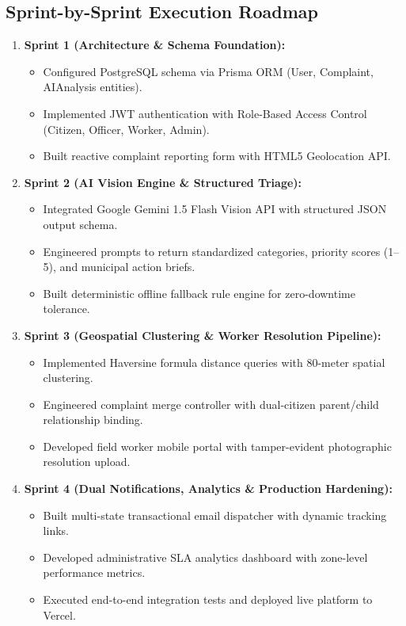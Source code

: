 \documentclass[11pt,a4paper]{article}
\begin{document}
\subsection{Sprint-by-Sprint Execution Roadmap}
\begin{enumerate}[leftmargin=1.5em]
    \item \textbf{Sprint 1 (Architecture \& Schema Foundation):}
    \begin{itemize}
        \item Configured PostgreSQL schema via Prisma ORM (User, Complaint, AIAnalysis entities).
        \item Implemented JWT authentication with Role-Based Access Control (Citizen, Officer, Worker, Admin).
        \item Built reactive complaint reporting form with HTML5 Geolocation API.
    \end{itemize}
    \item \textbf{Sprint 2 (AI Vision Engine \& Structured Triage):}
    \begin{itemize}
        \item Integrated Google Gemini 1.5 Flash Vision API with structured JSON output schema.
        \item Engineered prompts to return standardized categories, priority scores (1--5), and municipal action briefs.
        \item Built deterministic offline fallback rule engine for zero-downtime tolerance.
    \end{itemize}
    \item \textbf{Sprint 3 (Geospatial Clustering \& Worker Resolution Pipeline):}
    \begin{itemize}
        \item Implemented Haversine formula distance queries with 80-meter spatial clustering.
        \item Engineered complaint merge controller with dual-citizen parent/child relationship binding.
        \item Developed field worker mobile portal with tamper-evident photographic resolution upload.
    \end{itemize}
    \item \textbf{Sprint 4 (Dual Notifications, Analytics \& Production Hardening):}
    \begin{itemize}
        \item Built multi-state transactional email dispatcher with dynamic tracking links.
        \item Developed administrative SLA analytics dashboard with zone-level performance metrics.
        \item Executed end-to-end integration tests and deployed live platform to Vercel.
    \end{itemize}
\end{enumerate}
\end{document}
